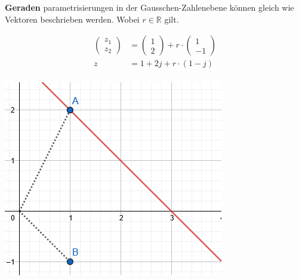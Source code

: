 \begin{minipage}{\columnwidth}	
	\noindent\textbf{Geraden} parametrisierungen in der Gausschen-Zahlenebene können gleich wie Vektoren beschrieben werden. Wobei $r \in \mathbb{R}$ gilt.
		
	\begin{minipage}{0.6\textwidth}
		\begin{align*}
			\begin{pmatrix}z_1 \\ z_2\end{pmatrix} &= \begin{pmatrix}1 \\ 2\end{pmatrix} +  r \cdot \begin{pmatrix}1 \\ -1\end{pmatrix} \\
			z &= 1 + 2j + r \cdot (1-j) \\
		\end{align*}
	\end{minipage}%
	\begin{minipage}{0.4\textwidth}
		\includegraphics[width=\columnwidth]{Images/parameter_gerade}
	\end{minipage}
\end{minipage}
~\\
